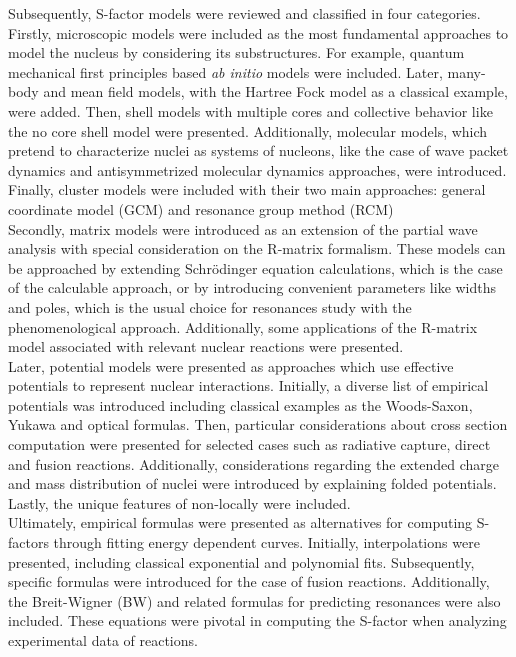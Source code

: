 \documentclass[openany]{book}
\begin{document}
Subsequently, S-factor models were reviewed and classified in four categories. Firstly, microscopic models were included as the most fundamental approaches to model the nucleus by considering its substructures. For example, quantum mechanical first principles based \textit{ab initio} models were included. Later, many-body and mean field models, with the Hartree Fock model as a classical example, were added. Then, shell models with multiple cores and collective behavior like the no core shell model were presented. Additionally, molecular models, which pretend to characterize nuclei as systems of nucleons, like the case of wave packet dynamics and antisymmetrized molecular dynamics approaches, were introduced. Finally, cluster models were included with their two main approaches: general coordinate model (GCM) and resonance group method (RCM) \\

Secondly, matrix models were introduced as an extension of the partial wave analysis with special consideration on the R-matrix formalism. These models can be approached by extending Schrödinger equation calculations, which is the case of the calculable approach, or by introducing convenient parameters like widths and poles, which is the usual choice for resonances study with the phenomenological approach. Additionally, some applications of the R-matrix model associated with relevant nuclear reactions were presented. \\

Later, potential models were presented as approaches which use effective potentials to represent nuclear interactions. Initially, a diverse list of empirical potentials was introduced including classical examples as the Woods-Saxon, Yukawa and optical formulas. Then, particular considerations about cross section computation were presented for selected cases such as radiative capture, direct and fusion reactions. Additionally, considerations regarding the extended charge and mass distribution of nuclei were introduced by explaining folded potentials. Lastly, the unique features of non-locally were included. \\

Ultimately, empirical formulas were presented as alternatives for computing S-factors through fitting energy dependent curves. Initially, interpolations were presented, including classical exponential and polynomial fits. Subsequently, specific formulas were introduced for the case of fusion reactions. Additionally, the Breit-Wigner (BW) and related formulas for predicting resonances were also included. These equations were pivotal in computing the S-factor when analyzing experimental data of reactions. \\
\end{document}
